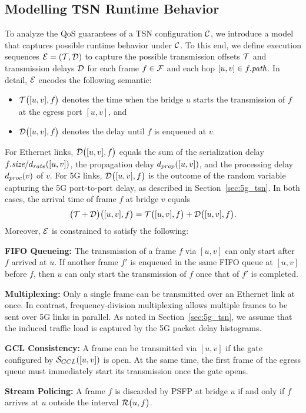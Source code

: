 \subsection{Modelling TSN Runtime Behavior} \label{sec:execution_sequences}
To analyze the QoS guarantees of a TSN configuration $\mathcal{C}$, we introduce a model that captures possible runtime behavior under $\mathcal{C}$.
To this end, we define execution sequences $\E = (\T{}, \D{})$ to capture the possible transmission offsets $\T{}$ and transmission delays $\D{}$ for each frame $f \in \mathcal{F}$ and each hop $[u,v] \in f.\textit{path}$.
In detail, $\mathcal{E}$ encodes the following semantic:
\begin{itemize}
  \item $\T{[u,v], f}$ denotes the time when the bridge $u$ starts the transmission of $f$ at the egress port $[u,v]$, and
  \item $\D{[u,v], f}$ denotes the delay until $f$ is enqueued at $v$.
\end{itemize}
For Ethernet links, $\D{[u,v], f}$ equals the sum of the serialization delay $f.\textit{size} / d_{rate}([u,v])$, the propagation delay $d_{prop}([u,v])$, and the processing delay $d_{proc}(v)$ of $v$.
For 5G links, $\D{[u,v], f}$ is the outcome of the random variable capturing the 5G port-to-port delay, as described in Section~\ref{sec:5g_tsn}.
In both cases, the arrival time of frame $f$ at bridge $v$ equals
\begin{equation*}
  \add{\T}{\D}{[u,v], f} = \T{[u,v], f} + \D{[u,v], f}.
\end{equation*}
Moreover, $\mathcal{E}$ is constrained to satisfy the following:

\textbf{FIFO Queueing:}
The transmission of a frame $f$ via $[u,v]$ can only start after $f$ arrived at $u$. 
If another frame $f'$ is enqueued in the same FIFO queue at $[u,v]$ before $f$, then $u$ can only start the transmission of $f$ once that of $f'$ is completed.

\textbf{Multiplexing:}
Only a single frame can be transmitted over an Ethernet link at once.
In contrast, frequency-division multiplexing allows multiple frames to be sent over 5G links in parallel.
As noted in Section~\ref{sec:5g_tsn}, we assume that the induced traffic load is captured by the 5G packet delay histograms.

\textbf{GCL Consistency:}
A frame can be transmitted via $[u,v]$ if the gate configured by $\mathcal{S}_{GCL}([u,v])$ is open.
At the same time, the first frame of the egress queue must immediately start its transmission once the gate opens.

\textbf{Stream Policing:}
A frame $f$ is discarded by PSFP at bridge $u$ if and only if $f$ arrives at $u$ outside the interval $\R{u, f}$.
